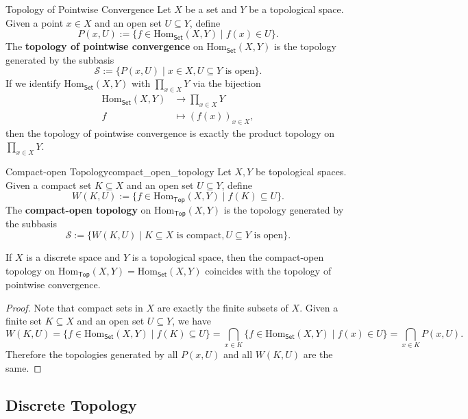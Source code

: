 \documentclass{report}
\begin{document}
\begin{definition}{Topology of Pointwise Convergence}
	Let $X$ be a set and $Y$ be a topological space. Given a point $x\in X$ and an open set $U\subseteq Y$, define
	\[
	P(x, U):=\{f\in \mathrm{Hom}_{\mathsf{Set}}(X,Y)\mid f(x)\in U\}.
	\]
	The \textbf{topology of pointwise convergence} on $\mathrm{Hom}_{\mathsf{Set}}(X,Y)$ is the topology generated by the subbasis
	\[
	\mathcal{S}:=\{P(x,U)\mid x\in X, U\subseteq Y \text{ is open}\}.
	\]
	If we identify $\mathrm{Hom}_{\mathsf{Set}}(X,Y)$ with $\prod_{x\in X}Y$ via the bijection 
	\begin{align*}
	\mathrm{Hom}_{\mathsf{Set}}(X,Y)&\longrightarrow \prod_{x\in X}Y\\	
	f&\longmapsto (f(x))_{x\in X}, 
	\end{align*}
	then the topology of pointwise convergence is exactly the product topology on $\prod_{x\in X}Y$.
\end{definition}

\begin{definition}{Compact-open Topology}{compact_open_topology}
	Let $X,Y$ be topological spaces. Given a compact set $K\subseteq X$ and an open set $U \subseteq Y$, define
	\[
		W(K,U):=\{f\in\mathrm{Hom}_{\mathsf{Top}}(X,Y)\mid f(K)\subseteq U\}.
	\]
	The \textbf{compact-open topology} on $\mathrm{Hom}_{\mathsf{Top}}(X,Y)$ is the topology generated by the subbasis 
	\[
		\mathcal{S}:=\{W(K,U)\mid K\subseteq X \text{ is compact}, U\subseteq Y \text{ is open}\}.
	\]
\end{definition}

\begin{proposition}{}{}
	If $X$ is a discrete space and $Y$ is a topological space, then the compact-open topology on $\mathrm{Hom}_{\mathsf{Top}}(X,Y)=\mathrm{Hom}_{\mathsf{Set}}(X,Y)$ coincides with the topology of pointwise convergence.
\end{proposition}
\begin{proof}
	Note that compact sets in $X$ are exactly the finite subsets of $X$. Given a finite set $K\subseteq X$ and an open set $U\subseteq Y$, we have
	\[
		W(K,U)=\{f\in\mathrm{Hom}_{\mathsf{Set}}(X,Y)\mid f(K)\subseteq U\}=\bigcap_{x\in K} \{f\in\mathrm{Hom}_{\mathsf{Set}}(X,Y)\mid f(x)\in U\}=\bigcap_{x\in K} P(x,U).
	\]
	Therefore the topologies generated by all $P(x,U)$ and all $W(K,U)$ are the same.
\end{proof}

\subsection{Discrete Topology}
\end{document}
